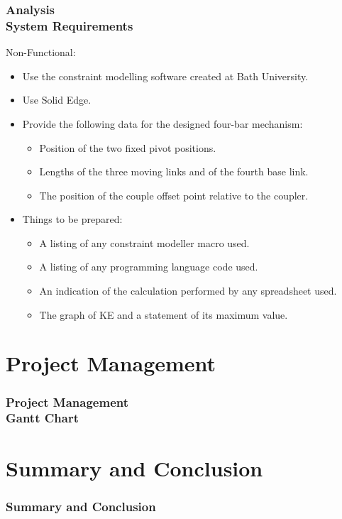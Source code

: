 \documentclass[ucs,10pt]{beamer}
\begin{document}
\begin{frame}
\frametitle{Analysis \\
    \small \color{rwth-blue} System Requirements}
    Non-Functional:
    \begin{itemize}
        \item Use the constraint modelling software created at Bath University.
        \item Use Solid Edge.
        \item Provide the following data for the designed four-bar mechanism:
        \begin{itemize}
            \item Position of the two fixed pivot positions.
            \item Lengths of the three moving links and of the fourth base link.
            \item The position of the couple offset point relative to the coupler.
        \end{itemize}
        \item Things to be prepared:
        \begin{itemize}
            \item A listing of any constraint modeller macro used.
            \item A listing of any programming language code used.
            \item An indication of the calculation performed by any spreadsheet used.
            \item The graph of KE and a statement of its maximum value.
        \end{itemize}
    \end{itemize}
\end{frame}



\section{Project Management}

\begin{frame}
\frametitle{Project Management \\
    \small \color{rwth-blue} Gantt Chart}
\end{frame}



\section{Summary and Conclusion}

\begin{frame}
\frametitle{Summary and Conclusion}
\end{frame}
\end{document}
